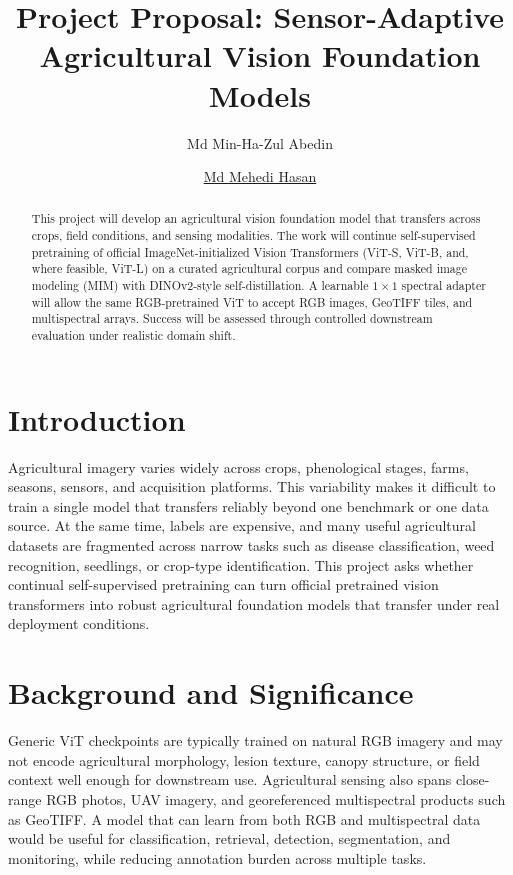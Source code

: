 \documentclass[10pt,twocolumn,letterpaper]{article}
\title{Project Proposal: Sensor-Adaptive Agricultural Vision Foundation Models}
\author{
Md Min-Ha-Zul Abedin \and
\href{https://auburn.instructure.com/courses/1739241/users/4120097}{Md Mehedi Hasan}
}
\begin{document}
\maketitle

\begin{abstract}
This project will develop an agricultural vision foundation model that transfers across crops, field conditions, and sensing modalities. The work will continue self-supervised pretraining of official ImageNet-initialized Vision Transformers (ViT-S, ViT-B, and, where feasible, ViT-L) on a curated agricultural corpus and compare masked image modeling (MIM) with DINOv2-style self-distillation. A learnable $1 \times 1$ spectral adapter will allow the same RGB-pretrained ViT to accept RGB images, GeoTIFF tiles, and multispectral arrays. Success will be assessed through controlled downstream evaluation under realistic domain shift.
\end{abstract}

\section{Introduction}
Agricultural imagery varies widely across crops, phenological stages, farms, seasons, sensors, and acquisition platforms. This variability makes it difficult to train a single model that transfers reliably beyond one benchmark or one data source. At the same time, labels are expensive, and many useful agricultural datasets are fragmented across narrow tasks such as disease classification, weed recognition, seedlings, or crop-type identification. This project asks whether continual self-supervised pretraining can turn official pretrained vision transformers into robust agricultural foundation models that transfer under real deployment conditions.

\section{Background and Significance}
Generic ViT checkpoints are typically trained on natural RGB imagery and may not encode agricultural morphology, lesion texture, canopy structure, or field context well enough for downstream use. Agricultural sensing also spans close-range RGB photos, UAV imagery, and georeferenced multispectral products such as GeoTIFF. A model that can learn from both RGB and multispectral data would be useful for classification, retrieval, detection, segmentation, and monitoring, while reducing annotation burden across multiple tasks.
\end{document}

